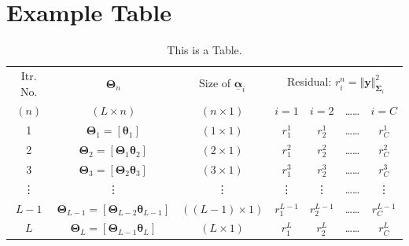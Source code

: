 \section{Example Table}

\begin{table}[!ht]
\centering
\begin{tabular}{|c|c|c|c|c|c|c|}
\hline
Itr. No. & $\boldsymbol \Theta_n$ & Size of $\underline{\boldsymbol \alpha}_i$ & \multicolumn{4}{c|}{Residual: $r_i^n = \Vert \mathbf{y} \Vert_{\boldsymbol \Sigma_i}^{2}$} \\ \cline{4-7}
$(n)$ & $(L \times n)$ & $(n \times 1)$ & $i=1$ & $i=2$ & \dots \dots & $i=C$ \\
\hline
1 & $\boldsymbol \Theta_1 = [\boldsymbol \theta_1]$ & $(1 \times 1)$ & $r_1^1$ & $r_2^1$ & \dots \dots & $r_C^1$ \\
\hline
2 & $\boldsymbol \Theta_2 = [\boldsymbol \Theta_1 \boldsymbol \theta_2]$ & $(2 \times 1)$ & $r_1^2$ & $r_2^2$ & \dots \dots & $r_C^2$ \\
\hline
3 & $\boldsymbol \Theta_3 = [\boldsymbol \Theta_2 \boldsymbol \theta_3]$ & $(3 \times 1)$ & $r_1^3$ & $r_2^3$ & \dots \dots & $r_C^3$ \\
\hline
\vdots & \vdots & \vdots & \vdots & \vdots & \dots \dots & \vdots \\
\hline
$L-1$ & $\boldsymbol \Theta_{L-1} = [\boldsymbol \Theta_{L-2} \boldsymbol \theta_{L-1}]$ & $((L-1) \times 1)$ & $r_1^{L-1}$ & $r_2^{L-1}$ & \dots \dots & $r_C^{L-1}$ \\
\hline
$L$ & $\boldsymbol \Theta_L = [\boldsymbol \Theta_{L-1} \boldsymbol \theta_L]$ & $(L \times 1)$ & $r_1^L$ & $r_2^L$ & \dots \dots & $r_C^L$ \\
\hline
\end{tabular}
\caption{This is a Table.}
\label{tab:Table}
\end{table}
